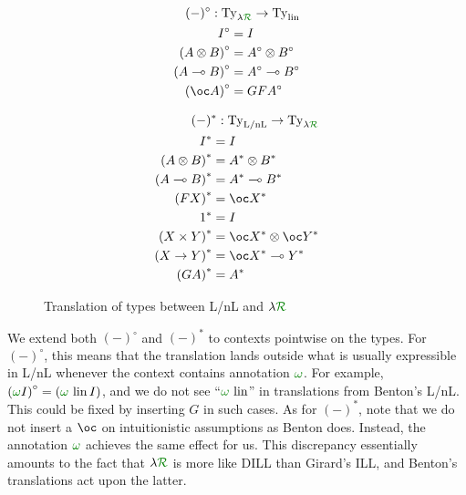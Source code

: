 \begin{figure}
  \centering
  \begin{subfigure}{.49\linewidth}
    \centering
    \begin{align*}
      (-)^\circ : \mathrm{Ty}_{\name} \to \mathrm{Ty}_{\lin} \\
      \begin{aligned}
        I^\circ &= I \\
        \plr{A \otimes B}^\circ &= A^\circ \otimes B^\circ \\
        \plr{A \multimap B}^\circ &= A^\circ \multimap B^\circ \\
        \plr{\oc A}^\circ &= GFA^\circ
      \end{aligned}
    \end{align*}
  \end{subfigure}
  \begin{subfigure}{.49\linewidth}
    \centering
    \begin{align*}
      (-)^* : \mathrm{Ty}_\lnl \to \mathrm{Ty}_{\name} \\
      \begin{aligned}
        I^* &= I \\
        \plr{A \otimes B}^* &= A^* \otimes B^* \\
        \plr{A \multimap B}^* &= A^* \multimap B^* \\
        \plr{FX}^* &= \oc X^* \\
        1^* &= I \\
        \plr{X \times Y}^* &= \oc X^* \otimes \oc Y^* \\
        \plr{X \to Y}^* &= \oc X^* \multimap Y^* \\
        \plr{GA}^* &= A^*
      \end{aligned}
    \end{align*}
  \end{subfigure}
  \caption{Translation of types between L/nL and $\name$}
  \label{fig:lnl-lr-types}
\end{figure}

We extend both $(-)^\circ$ and $(-)^*$ to contexts pointwise on the types.
For $(-)^\circ$, this means that the translation lands outside what is usually
expressible in L/nL whenever the context contains annotation $\gr\omega$.
For example, $\plr{\gr\omega I}^\circ = \plr{\gr\omega\,\lin I}$, and we do not
see ``$\gr\omega\,\lin$'' in translations from Benton's L/nL.
This could be fixed by inserting $G$ in such cases.
As for $(-)^*$, note that we do not insert a $\oc$ on intuitionistic assumptions
as Benton does.
Instead, the annotation $\gr\omega$ achieves the same effect for us.
This discrepancy essentially amounts to the fact that $\name$ is more like DILL
than Girard's ILL, and Benton's translations act upon the latter.

